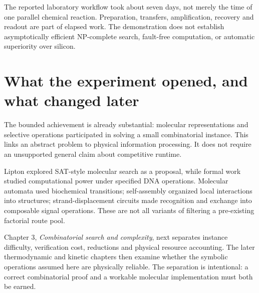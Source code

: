 The reported laboratory workflow took about seven days, not merely the time of one parallel chemical reaction.\cite{adleman} Preparation, transfers, amplification, recovery and readout are part of elapsed work. The demonstration does not establish asymptotically efficient NP-complete search, fault-free computation, or automatic superiority over silicon.

\section{What the experiment opened, and what changed later}
The bounded achievement is already substantial: molecular representations and selective operations participated in solving a small combinatorial instance. This links an abstract problem to physical information processing. It does not require an unsupported general claim about competitive runtime.


Lipton explored SAT-style molecular search as a proposal,\cite{d2lipton} while formal work studied computational power under specified DNA operations.\cite{d2boneh} Molecular automata used biochemical transitions;\cite{benenson} self-assembly organized local interactions into structures;\cite{assembly} strand-displacement circuits made recognition and exchange into composable signal operations.\cite{d2seelig} These are not all variants of filtering a pre-existing factorial route pool.

Chapter 3, \emph{Combinatorial search and complexity}, next separates instance difficulty, verification cost, reductions and physical resource accounting. The later thermodynamic and kinetic chapters then examine whether the symbolic operations assumed here are physically reliable. The separation is intentional: a correct combinatorial proof and a workable molecular implementation must both be earned.

